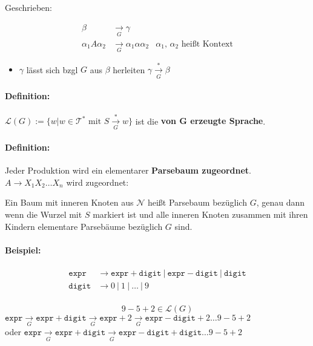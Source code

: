 Geschrieben:
\begin{minipage}[t]{0.5\linewidth}
\begin{align*}
 \beta &\xrightarrow[G]{} \gamma \\
 \alpha_1A\alpha_2 &\xrightarrow[G]{} \alpha_1\alpha\alpha_2 & \text{$\alpha_1$, $\alpha_2$ heißt Kontext}
\end{align*}
\end{minipage}
\begin{itemize}
 \item $\gamma$ lässt sich bzgl $G$ aus $\beta$ herleiten $\gamma \xrightarrow[G]{*} \beta$
\end{itemize}

\paragraph{Definition:}
$\mathcal{L}(G) := \{w | w \in \mathcal{T}^*\text{ mit } S  \xrightarrow[G]{*} w \}$
ist die \textbf{von $\boldsymbol{G}$ erzeugte Sprache}.

\paragraph{Definition:} Jeder Produktion wird ein elementarer \textbf{Parsebaum zugeordnet}.\\
$A \to X_1X_2\dots X_n$ wird zugeordnet:
\begin{minipage}[t]{0.5\linewidth}
\end{minipage}
Ein Baum mit inneren Knoten aus $\mathcal{N}$ heißt Parsebaum bezüglich $G$, genau dann wenn die Wurzel mit $S$ markiert ist und alle inneren Knoten zusammen mit ihren Kindern elementare Parsebäume bezüglich $G$ sind.

\paragraph{Beispiel:}
\begin{minipage}[t]{0.2\linewidth}
\begin{align*}
 \mathtt{expr} &\to \mathtt{expr} + \mathtt{digit}\ |\ \mathtt{expr} - \mathtt{digit}\ |\ \mathtt{digit} \\
 \mathtt{digit} &\to 0\ |\ 1\ |\ \dots\ |\ 9 \\
\end{align*}
\end{minipage}
\[9 - 5 + 2 \in \mathcal{L}(G)\]
$\mathtt{expr} \xrightarrow[G]{} \mathtt{expr} + \mathtt{digit} \xrightarrow[G]{} \mathtt{expr} + 2 \xrightarrow[G]{} \mathtt{expr} - \mathtt{digit} + 2 \dots 9-5+2$\\
oder $\mathtt{expr} \xrightarrow[G]{} \mathtt{expr} + \mathtt{digit} \xrightarrow[G]{} \mathtt{expr} - \mathtt{digit} + \mathtt{digit} \dots 9-5+2$
\begin{minipage}[t]{0.5\linewidth}
\end{minipage}


